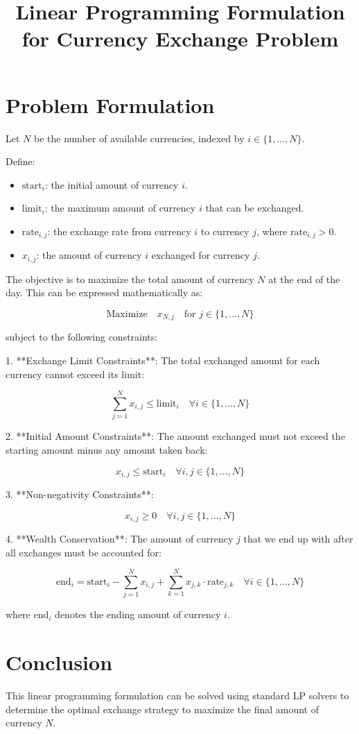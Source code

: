 \documentclass{article}
\begin{document}
\title{Linear Programming Formulation for Currency Exchange Problem}
\author{}
\date{}
\maketitle

\section*{Problem Formulation}

Let \( N \) be the number of available currencies, indexed by \( i \in \{1, \ldots, N\} \).

Define:
\begin{itemize}
    \item \( \text{start}_i \): the initial amount of currency \( i \).
    \item \( \text{limit}_i \): the maximum amount of currency \( i \) that can be exchanged.
    \item \( \text{rate}_{i,j} \): the exchange rate from currency \( i \) to currency \( j \), where \( \text{rate}_{i,j} > 0 \).
    \item \( x_{i,j} \): the amount of currency \( i \) exchanged for currency \( j \).
\end{itemize}

The objective is to maximize the total amount of currency \( N \) at the end of the day. This can be expressed mathematically as:

\[
\text{Maximize} \quad x_{N,j} \quad \text{for } j \in \{1, \ldots, N\}
\]

subject to the following constraints:

1. **Exchange Limit Constraints**: The total exchanged amount for each currency cannot exceed its limit:

\[
\sum_{j=1}^N x_{i,j} \leq \text{limit}_i \quad \forall i \in \{1, \ldots, N\}
\]

2. **Initial Amount Constraints**: The amount exchanged must not exceed the starting amount minus any amount taken back:

\[
x_{i,j} \leq \text{start}_i \quad \forall i,j \in \{1, \ldots, N\}
\]

3. **Non-negativity Constraints**:

\[
x_{i,j} \geq 0 \quad \forall i,j \in \{1, \ldots, N\}
\]

4. **Wealth Conservation**: The amount of currency \( j \) that we end up with after all exchanges must be accounted for:

\[
\text{end}_i = \text{start}_i - \sum_{j=1}^N x_{i,j} + \sum_{k=1}^N x_{j,k} \cdot \text{rate}_{j,k} \quad \forall i \in \{1, \ldots, N\}
\]

where \( \text{end}_i \) denotes the ending amount of currency \( i \).

\section*{Conclusion}

This linear programming formulation can be solved using standard LP solvers to determine the optimal exchange strategy to maximize the final amount of currency \( N \). 
\end{document}
